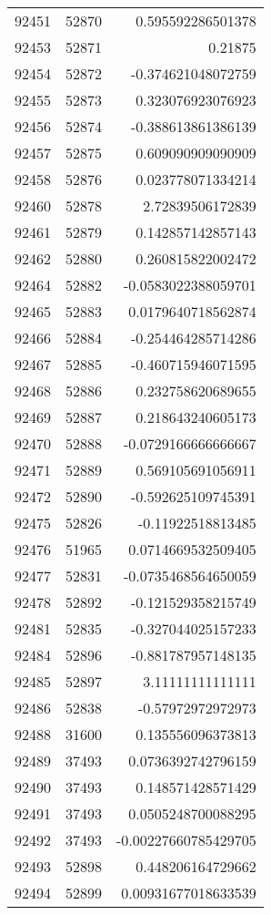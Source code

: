 \begin{tabular}{r | r | r}
92451 & 52870 & 0.595592286501378 \\
92453 & 52871 & 0.21875 \\
92454 & 52872 & -0.374621048072759 \\
92455 & 52873 & 0.323076923076923 \\
92456 & 52874 & -0.388613861386139 \\
92457 & 52875 & 0.609090909090909 \\
92458 & 52876 & 0.023778071334214 \\
92460 & 52878 & 2.72839506172839 \\
92461 & 52879 & 0.142857142857143 \\
92462 & 52880 & 0.260815822002472 \\
92464 & 52882 & -0.0583022388059701 \\
92465 & 52883 & 0.0179640718562874 \\
92466 & 52884 & -0.254464285714286 \\
92467 & 52885 & -0.460715946071595 \\
92468 & 52886 & 0.232758620689655 \\
92469 & 52887 & 0.218643240605173 \\
92470 & 52888 & -0.0729166666666667 \\
92471 & 52889 & 0.569105691056911 \\
92472 & 52890 & -0.592625109745391 \\
92475 & 52826 & -0.11922518813485 \\
92476 & 51965 & 0.0714669532509405 \\
92477 & 52831 & -0.0735468564650059 \\
92478 & 52892 & -0.121529358215749 \\
92481 & 52835 & -0.327044025157233 \\
92484 & 52896 & -0.881787957148135 \\
92485 & 52897 & 3.11111111111111 \\
92486 & 52838 & -0.57972972972973 \\
92488 & 31600 & 0.135556096373813 \\
92489 & 37493 & 0.0736392742796159 \\
92490 & 37493 & 0.148571428571429 \\
92491 & 37493 & 0.0505248700088295 \\
92492 & 37493 & -0.00227660785429705 \\
92493 & 52898 & 0.448206164729662 \\
92494 & 52899 & 0.00931677018633539 \\

\end{tabular}
